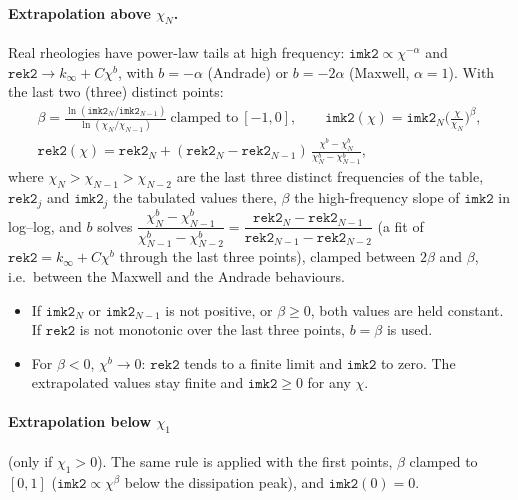 \paragraph{Extrapolation above $\chi_N$.} Real rheologies have power-law tails at high frequency: $\texttt{imk2}\propto\chi^{-\alpha}$ and $\texttt{rek2}\to k_\infty+C\chi^{b}$, with $b=-\alpha$ (Andrade) or $b=-2\alpha$ (Maxwell, $\alpha=1$). With the last two (three) distinct points:
\begin{equation}
  \begin{gathered}
  \beta=\frac{\ln(\texttt{imk2}_N/\texttt{imk2}_{N-1})}{\ln(\chi_N/\chi_{N-1})}\ \text{clamped to}\ [-1,0],\qquad
  \texttt{imk2}(\chi)=\texttt{imk2}_N\Big(\frac{\chi}{\chi_N}\Big)^{\beta},\\
  \texttt{rek2}(\chi)=\texttt{rek2}_N+(\texttt{rek2}_N-\texttt{rek2}_{N-1})\,\frac{\chi^{b}-\chi_N^{b}}{\chi_N^{b}-\chi_{N-1}^{b}},
  \end{gathered} \label{eq:extrap}
\end{equation}
where $\chi_N>\chi_{N-1}>\chi_{N-2}$ are the last three distinct frequencies of the table, $\texttt{rek2}_j$ and $\texttt{imk2}_j$ the tabulated values there, $\beta$ the high-frequency slope of $\texttt{imk2}$ in log--log, and $b$ solves $\dfrac{\chi_N^b-\chi_{N-1}^b}{\chi_{N-1}^b-\chi_{N-2}^b}=\dfrac{\texttt{rek2}_N-\texttt{rek2}_{N-1}}{\texttt{rek2}_{N-1}-\texttt{rek2}_{N-2}}$ (a fit of $\texttt{rek2}=k_\infty+C\chi^b$ through the last three points), clamped between $2\beta$ and $\beta$, i.e.\ between the Maxwell and the Andrade behaviours.
\begin{itemize}
  \item If $\texttt{imk2}_N$ or $\texttt{imk2}_{N-1}$ is not positive, or $\beta\ge0$, both values are held constant. If $\texttt{rek2}$ is not monotonic over the last three points, $b=\beta$ is used.
  \item For $\beta<0$, $\chi^b\to0$: $\texttt{rek2}$ tends to a finite limit and $\texttt{imk2}$ to zero. The extrapolated values stay finite and $\texttt{imk2}\ge0$ for any $\chi$.
\end{itemize}

\paragraph{Extrapolation below $\chi_1$} (only if $\chi_1>0$). The same rule is applied with the first points, $\beta$ clamped to $[0,1]$ ($\texttt{imk2}\propto\chi^{\beta}$ below the dissipation peak), and $\texttt{imk2}(0)=0$.

